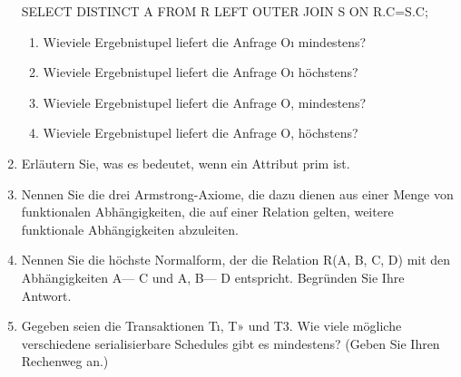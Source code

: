 \documentclass{lehramt-informatik-aufgabe}
\begin{document}
\begin{enumerate}
SELECT DISTINCT A
FROM R LEFT OUTER JOIN S ON R.C=S.C;

\begin{enumerate}
\item Wieviele Ergebnistupel liefert die Anfrage Oı mindestens?
\item Wieviele Ergebnistupel liefert die Anfrage Oı höchstens?
\item Wieviele Ergebnistupel liefert die Anfrage O, mindestens?
\item Wieviele Ergebnistupel liefert die Anfrage O, höchstens?
\end{enumerate}


\item Erläutern Sie, was es bedeutet, wenn ein Attribut prim ist.


\item Nennen Sie die drei Armstrong-Axiome, die dazu dienen aus einer Menge von funktionalen Abhängigkeiten, die auf einer Relation gelten, weitere funktionale Abhängigkeiten abzuleiten.


\item Nennen Sie die höchste Normalform, der die Relation R(A, B, C, D) mit den Abhängigkeiten
A— C und A, B— D entspricht. Begründen Sie Ihre Antwort.


\item Gegeben seien die Transaktionen Tı, T» und T3. Wie viele mögliche verschiedene serialisierbare
Schedules gibt es mindestens? (Geben Sie Ihren Rechenweg an.)

\end{enumerate}
\end{document}
